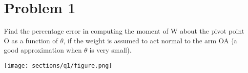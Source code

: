 \section*{Problem 1}

Find the percentage error in computing the moment of W about the pivot point O as a function of \( \theta \), if the weight is assumed to act normal to the arm OA (a good approximation when \( \theta \) is very small).

\begin{figure*}[h]
    \centering
    \texttt{[image: sections/q1/figure.png]}
\end{figure*}

